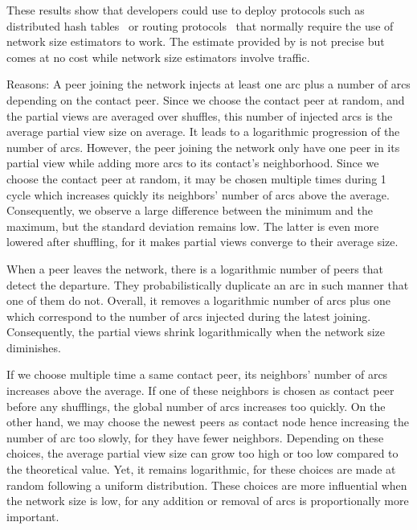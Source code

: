 \begin{asparadesc}
  These results show that developers could use \SPRAY to deploy protocols such
  as distributed hash tables~\cite{camarillo2014self} or routing
  protocols~\cite{kleinberg2000smallworld} that normally require the use of
  network size estimators to work. The estimate provided by \SPRAY is not
  precise but comes at no cost while network size estimators involve traffic.

\item [Reasons:] A peer joining the network injects at least one arc plus a
  number of arcs depending on the contact peer. Since we choose the contact peer
  at random, and the partial views are averaged over shuffles, this number of
  injected arcs is the average partial view size on average. It leads to a
  logarithmic progression of the number of arcs. However, the peer joining the
  network only have one peer in its partial view while adding more arcs to its
  contact's neighborhood. Since we choose the contact peer at random, it may be
  chosen multiple times during 1 cycle which increases quickly its neighbors'
  number of arcs above the average. Consequently, we observe a large difference
  between the minimum and the maximum, but the standard deviation remains
  low. The latter is even more lowered after shuffling, for it makes partial
  views converge to their average size. 

  When a peer leaves the network, there is a logarithmic number of peers that
  detect the departure. They probabilistically duplicate an arc in such manner
  that one of them do not. Overall, it removes a logarithmic number of arcs plus
  one which correspond to the number of arcs injected during the latest
  joining. Consequently, the partial views shrink logarithmically when the
  network size diminishes.

  If we choose multiple time a same contact peer, its neighbors' number of arcs
  increases above the average. If one of these neighbors is chosen as contact
  peer before any shufflings, the global number of arcs increases too
  quickly. On the other hand, we may choose the newest peers as contact node
  hence increasing the number of arc too slowly, for they have fewer
  neighbors. Depending on these choices, the average partial view size can grow
  too high or too low compared to the theoretical value. Yet, it remains
  logarithmic, for these choices are made at random following a uniform
  distribution. These choices are more influential when the network size is low,
  for any addition or removal of arcs is proportionally more important.
\end{asparadesc}

